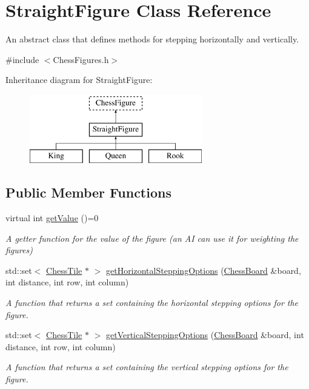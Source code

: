 \hypertarget{classStraightFigure}{}\section{Straight\+Figure Class Reference}
\label{classStraightFigure}


An abstract class that defines methods for stepping horizontally and vertically.  




{\ttfamily \#include $<$Chess\+Figures.\+h$>$}

Inheritance diagram for Straight\+Figure\+:\begin{figure}[H]
\begin{center}
\leavevmode
\includegraphics[height=3.000000cm]{classStraightFigure}
\end{center}
\end{figure}
\subsection*{Public Member Functions}
\begin{DoxyCompactItemize}
\item 
\mbox{\label{classStraightFigure_a09d46ae2b3f043b9ac3e05ed6d95d420}} 
virtual int \mbox{\hyperlink{classStraightFigure_a09d46ae2b3f043b9ac3e05ed6d95d420}{get\+Value}} ()=0
\begin{DoxyCompactList}\small\item\em A getter function for the value of the figure (an AI can use it for weighting the figures) \end{DoxyCompactList}\item 
std\+::set$<$ \mbox{\hyperlink{classChessTile}{Chess\+Tile}} $\ast$ $>$ \mbox{\hyperlink{classStraightFigure_a847f8e60c70570c2156a36eb488927f5}{get\+Horizontal\+Stepping\+Options}} (\mbox{\hyperlink{classChessBoard}{Chess\+Board}} \&board, int distance, int row, int column)
\begin{DoxyCompactList}\small\item\em A function that returns a set containing the horizontal stepping options for the figure. \end{DoxyCompactList}\item 
std\+::set$<$ \mbox{\hyperlink{classChessTile}{Chess\+Tile}} $\ast$ $>$ \mbox{\hyperlink{classStraightFigure_ae60af36598f16a5bbb01e56485625563}{get\+Vertical\+Stepping\+Options}} (\mbox{\hyperlink{classChessBoard}{Chess\+Board}} \&board, int distance, int row, int column)
\begin{DoxyCompactList}\small\item\em A function that returns a set containing the vertical stepping options for the figure. \end{DoxyCompactList}\end{DoxyCompactItemize}
